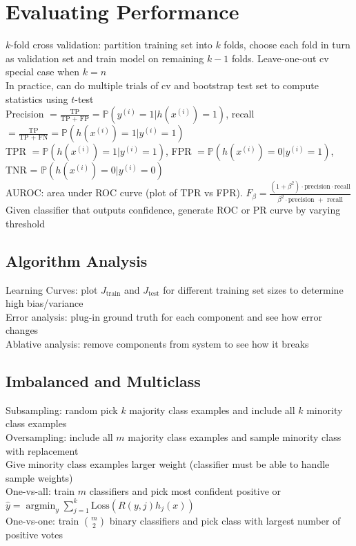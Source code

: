 \documentclass{article}
\DeclareMathOperator*{\argmin}{argmin}
\begin{document}
\section{Evaluating Performance}
$k$-fold cross validation: partition training set into $k$ folds, choose each fold in turn as validation set and train model on remaining $k-1$ folds. Leave-one-out cv special case when $k=n$ \\
In practice, can do multiple trials of cv and bootstrap test set to compute statistics using $t$-test \\
Precision $= \frac{\text{TP}}{\text{TP + FP}} = \mathbb{P}(y^{(i)} = 1 | h(x^{(i)}) = 1)$, recall $=\frac{\text{TP}}{\text{TP + FN}} = \mathbb{P}(h(x^{(i)}) = 1 | y^{(i)} = 1)$ \\
TPR $ = \mathbb{P}(h(x^{(i)}) = 1 | y^{(i)} = 1)$, FPR $ = \mathbb{P}(h(x^{(i)}) = 0 | y^{(i)} = 1)$, TNR = $\mathbb{P}(h(x^{(i)}) = 0 | y^{(i)} = 0)$ \\
AUROC: area under ROC curve (plot of TPR vs FPR). $F_\beta = \frac{(1+\beta^2) \cdot \text{precision} \cdot \text{recall} }{\beta^2 \cdot \text{precision } + \text{ recall}}$ \\
Given classifier that outputs confidence, generate ROC or PR curve by varying threshold 

\subsection{Algorithm Analysis}
Learning Curves: plot $J_{\text{train}}$ and $J_{\text{test}}$ for different training set sizes to determine high bias/variance \\
Error analysis: plug-in ground truth for each component and see how error changes \\
Ablative analysis: remove components from system to see how it breaks 

\subsection{Imbalanced and Multiclass}
Subsampling: random pick $k$ majority class examples and include all $k$ minority class examples \\
Oversampling: include all $m$ majority class examples and sample minority class with replacement \\
Give minority class examples larger weight (classifier must be able to handle sample weights) \\
One-vs-all: train $m$ classifiers and pick most confident positive or $\hat y = \argmin_y \sum_{j=1}^k \mbox{Loss}(R(y, j)h_j(x))$ \\
One-vs-one: train $m \choose 2$ binary classifiers and pick class with largest number of positive votes 
\end{document}
